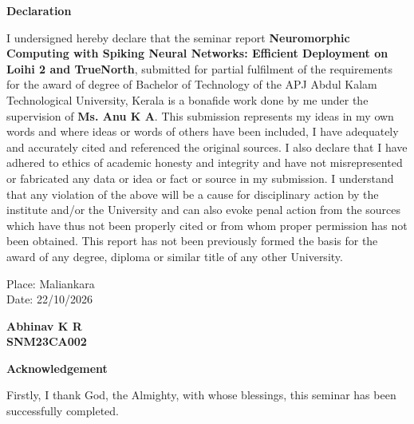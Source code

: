 \documentclass[12pt,a4paper,final]{extreport}
\begin{document}
\newpage

\thispagestyle{empty}
\begin{center}
\begin{huge}
\textbf{Declaration}
\end{huge}
\end{center}

\vskip0.5cm
I undersigned hereby declare that the seminar report \textbf{Neuromorphic Computing with Spiking Neural Networks: Efficient Deployment on Loihi 2 and TrueNorth}, submitted for partial fulfilment of the requirements for the award of degree of Bachelor of Technology of the APJ Abdul Kalam Technological University, Kerala is a bonafide work done by me under the supervision of \textbf{Ms. Anu K A}. This submission represents my ideas in my own words and where ideas or words of others have been included, I have adequately and accurately cited and referenced the original sources. I also declare that I have adhered to ethics of academic honesty and integrity and have not misrepresented or fabricated any data or idea or fact or source in my submission. I understand that any violation of the above will be a cause for disciplinary action by the institute and/or the University and can also evoke penal action from the sources which have thus not been properly cited or from whom proper permission has not been obtained. This report has not been previously formed the basis for the award of any degree, diploma or similar title of any other University.

\vspace{2cm}
\noindent
\begin{minipage}[t]{0.5\textwidth}
Place: Maliankara\\
Date: 22/10/2026
\end{minipage}%
\hfill
\begin{minipage}[t]{0.4\textwidth}
\centering
\textbf{Abhinav K R}\\
\textbf{SNM23CA002}
\end{minipage}

\newpage
\thispagestyle{plain}
\setcounter{page}{1}
\begin{center}
\begin{huge}
\textbf{Acknowledgement}
\end{huge}
\end{center}
\vskip1cm
\hspace*{1 cm} Firstly, I thank God, the Almighty, with whose blessings, this seminar has been successfully completed.
\end{document}
